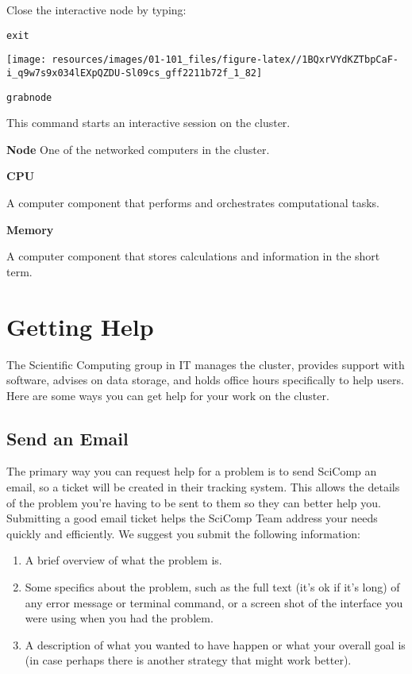 \documentclass[
]{book}
\providecommand{\tightlist}{%
  \setlength{\itemsep}{0pt}\setlength{\parskip}{0pt}}
\begin{document}
Close the interactive node by typing:

\begin{verbatim}
exit
\end{verbatim}

\texttt{[image: resources/images/01-101\_files/figure-latex//1BQxrVYdKZTbpCaF-i\_q9w7s9x034lEXpQZDU-Sl09cs\_gff2211b72f\_1\_82]}

\texttt{grabnode}

This command starts an interactive session on the cluster.

\textbf{Node}
One of the networked computers in the cluster.

\textbf{CPU}

A computer component that performs and orchestrates computational tasks.

\textbf{Memory}

A computer component that stores calculations and information in the short term.

\hypertarget{help}{%
\chapter{Getting Help}\label{help}}

The Scientific Computing group in IT manages the cluster, provides support with software, advises on data storage, and holds office hours specifically to help users. Here are some ways you can get help for your work on the cluster.

\hypertarget{send-an-email}{%
\section*{Send an Email}\label{send-an-email}}

The primary way you can request help for a problem is to send SciComp an email, so a ticket will be created in their tracking system. This allows the details of the problem you're having to be sent to them so they can better help you. Submitting a good email ticket helps the SciComp Team address your needs quickly and efficiently. We suggest you submit the following information:

\begin{enumerate}
\def\labelenumi{\arabic{enumi}.}
\tightlist
\item
  A brief overview of what the problem is.
\item
  Some specifics about the problem, such as the full text (it's ok if it's long) of any error message or terminal command, or a screen shot of the interface you were using when you had the problem.
\item
  A description of what you wanted to have happen or what your overall goal is (in case perhaps there is another strategy that might work better).
\end{enumerate}
\end{document}
